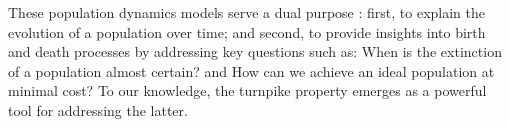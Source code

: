 \documentclass[10pt, a4]{amsart}
\theoremstyle{plain}
\theoremstyle{definition}
\theoremstyle{remark}
\numberwithin{equation}{section}
\begin{document}
These population dynamics models serve a dual purpose : first, to explain the evolution of a population over time; and second, to provide insights into birth and death processes by addressing key questions such as: When is the extinction of a population almost certain? and How can we achieve an ideal population at minimal cost? To our knowledge, the turnpike property emerges as a powerful tool for addressing the latter.
\end{document}
